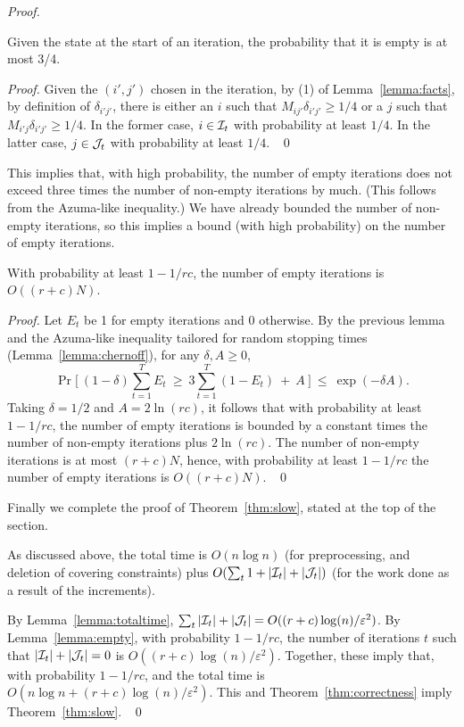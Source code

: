\documentclass[11pt]{svjour3} \usepackage{fullpage}
\newcommand{\MM}{M}
\newcommand{\Ip}{\calI}
\newcommand{\Jd}{\calJ}
\newcommand{\dd}{\delta}
\newenvironment{Proof}{\begin{proof}}{{} ~\hfill\hfill\qed~\end{proof}}
\newcommand{\eps}{\varepsilon}
\newcommand{\calI}{{\cal I}}
\newcommand{\calJ}{{\cal J}}
\newcommand{\inputsize}{n}
\begin{document}
\begin{Proof}
\begin{lemma}\label{lemma:threequarters}
Given the state at the start of an iteration,
the probability that it is empty is at most 3/4.
\end{lemma}
\begin{Proof}
Given the $(i',j')$ chosen in the iteration, 
by (1) of Lemma~\ref{lemma:facts},
by definition of $\delta_{i'j'}$,
there is either an $i$ such that
$\MM_{ij'}\dd_{i'j'} \ge 1/4$
or a $j$ such that
$\MM_{i'j}\dd_{i'j'} \ge 1/4$.
In the former case, $i\in\Ip_t$ with probability at least $1/4$.
In the latter case, $j\in\Jd_t$ with probability at least $1/4$.
\end{Proof}

This implies that, with high probability, the number of empty iterations
does not exceed three times the number of non-empty iterations by much.
(This follows from the Azuma-like inequality.)   We have already bounded
the number of non-empty iterations, so this implies a bound (with high probability)
on the number of empty iterations.

\begin{lemma}\label{lemma:empty}
With probability at least $1-1/rc$, the number of empty iterations is $O((r+c)N)$.
\end{lemma}
\begin{Proof}
Let $E_t$ be 1 for empty iterations and 0 otherwise.
By the previous lemma and the Azuma-like inequality tailored for random stopping times (Lemma~\ref{lemma:chernoff}), for any $\delta,A\ge 0$,
\[\Pr\Big[~\textstyle (1-\delta)\sum_{t=1}^T E_t ~\ge~ 3 \sum_{t=1}^T (1-E_t) ~+~ A~\Big]
~\le~\exp(-\delta A).
\]
Taking $\delta=1/2$ and $A =2\ln(rc)$,
it follows that with probability at least $1-1/rc$,
the number of  empty iterations
is bounded by a constant times the number of non-empty iterations
plus $2\ln(rc)$.
The number of non-empty iterations is at most $(r+c)N$,
hence, with probability at least $1-1/rc$
the number of empty iterations is $O((r+c)N)$.
\end{Proof}

Finally we complete the proof of Theorem~\ref{thm:slow}, stated at the top of the section.

As discussed above, the total time is
$O(\inputsize\log \inputsize)$ (for preprocessing, and deletion of covering constraints)
plus $O(\sum_t1+|\Ip_t|+|\Jd_t|)$ (for the work done as a result of the increments).

By Lemma~\ref{lemma:totaltime},
$\sum_t |\Ip_t|+|\Jd_t| = O((r+c)\log(n)/\eps^2)$.
By Lemma~\ref{lemma:empty}, with probability $1-1/rc$,
the number of iterations $t$ such that $|\Ip_t|+|\Jd_t| = 0$
is $O((r+c)\log(n)/\eps^2)$.
Together, these imply that, with probability $1-1/rc$,
and the total time is
$O(n\log n + (r+c)\log(n)/\eps^2)$.
This and Theorem~\ref{thm:correctness} imply Theorem~\ref{thm:slow}.
\end{Proof}
\end{document}
